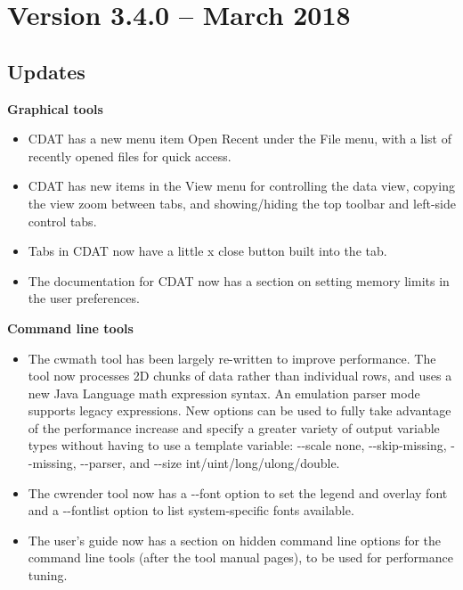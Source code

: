 
\section{Version 3.4.0 -- March 2018}

\subsection*{ Updates}

\hspace{0.4cm} {\bf Graphical tools}
\begin{itemize}

  \item CDAT has a new menu item {\gui Open Recent} under the {\gui File} menu,
  with a list of recently opened files for quick access.

  \item CDAT has new items in the {\gui View} menu for controlling the data
  view, copying the view zoom between tabs, and showing/hiding the top toolbar
  and left-side control tabs.

  \item Tabs in CDAT now have a little x close button built into the tab.

  \item The documentation for CDAT now has a section on setting memory limits
  in the user preferences.

\end{itemize}

\hspace{0.4cm} {\bf Command line tools}
\begin{itemize}

  \item The cwmath tool has been largely re-written to improve performance.
  The tool now processes 2D chunks of data rather than individual rows, and
  uses a new Java Language math expression syntax.  An emulation parser mode
  supports legacy expressions.  New options can be used to fully take advantage
  of the performance increase and specify a greater variety of output variable
  types without having to use a template variable: -{-}scale none,
  -{-}skip-missing, -{-}missing, -{-}parser, and -{-}size int/uint/long/ulong/double.

  \item The cwrender tool now has a -{-}font option to set the legend and overlay
  font and a -{-}fontlist option to list system-specific fonts available.

  \item The user's guide now has a section on hidden command line options for
  the command line tools (after the tool manual pages), to be used for
  performance tuning.

\end{itemize}

